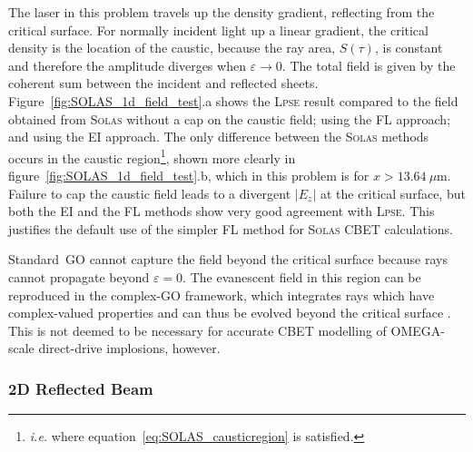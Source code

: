 The laser in this problem travels up the density gradient, reflecting from the critical surface.
For normally incident light up a linear gradient, the critical density is the location of the caustic, because the ray area, $S(\tau)$, is constant and therefore the amplitude diverges when $\varepsilon\rightarrow 0$.
The total field is given by the coherent sum between the incident and reflected sheets.
Figure~\ref{fig:SOLAS_1d_field_test}.a shows the \textsc{Lpse} result compared to the field obtained from \textsc{Solas} without a cap on the caustic field; using the \ac{FL} approach; and using the \ac{EI} approach.
The only difference between the \textsc{Solas} methods occurs in the caustic region\footnote{\textit{i.e.} where equation~\ref{eq:SOLAS_causticregion} is satisfied.}, shown more clearly in figure~\ref{fig:SOLAS_1d_field_test}.b, which in this problem is for $x>13.64\ \mu\text{m}$.
Failure to cap the caustic field leads to a divergent $|E_z|$ at the critical surface, but both the \ac{EI} and the \ac{FL} methods show very good agreement with \textsc{Lpse}.
This justifies the default use of the simpler \ac{FL} method for \textsc{Solas} \ac{CBET} calculations.

Standard~\ac{GO} cannot capture the field beyond the critical surface because rays cannot propagate beyond $\varepsilon=0$.
The evanescent field in this region can be reproduced in the complex-\ac{GO} framework, which integrates rays which have complex-valued properties and can thus be evolved beyond the critical surface \cite{colaitis_real_2019}.
This is not deemed to be necessary for accurate \ac{CBET} modelling of OMEGA-scale direct-drive implosions, however.

\subsubsection{2D Reflected Beam}

